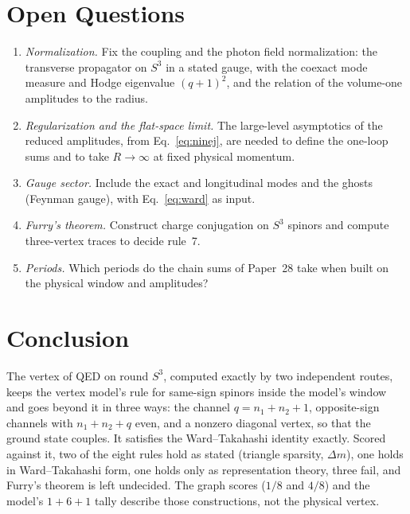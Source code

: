 \documentclass[11pt]{article}
\begin{document}
\section{Open Questions}
\label{sec:open}

\begin{enumerate}
\item \emph{Normalization.}  Fix the coupling and the photon field
  normalization: the transverse propagator on $S^3$ in a stated gauge,
  with the coexact mode measure and Hodge eigenvalue $(q+1)^2$, and the
  relation of the volume-one amplitudes to the radius.
\item \emph{Regularization and the flat-space limit.}  The large-level
  asymptotics of the reduced amplitudes, from Eq.~\eqref{eq:ninej}, are
  needed to define the one-loop sums and to take $R \to \infty$ at fixed
  physical momentum.
\item \emph{Gauge sector.}  Include the exact and longitudinal modes and
  the ghosts (Feynman gauge), with Eq.~\eqref{eq:ward} as input.
\item \emph{Furry's theorem.}  Construct charge conjugation on $S^3$
  spinors and compute three-vertex traces to decide rule~7.
\item \emph{Periods.}  Which periods do the chain sums of Paper~28 take
  when built on the physical window and amplitudes?
\end{enumerate}

\section{Conclusion}
\label{sec:conclusion}

The vertex of QED on round $S^3$, computed exactly by two independent
routes, keeps the vertex model's rule for same-sign spinors inside the
model's window and goes beyond it in three ways: the channel
$q = n_1 + n_2 + 1$, opposite-sign channels with $n_1 + n_2 + q$ even,
and a nonzero diagonal vertex, so that the ground state couples.  It
satisfies the Ward--Takahashi identity exactly.  Scored against it,
two of the eight rules hold as stated (triangle sparsity, $\Delta m$),
one holds in Ward--Takahashi form, one holds only as representation
theory, three fail, and Furry's theorem is left undecided.  The graph
scores ($1/8$ and $4/8$) and the model's $1{+}6{+}1$ tally describe those
constructions, not the physical vertex.
\end{document}
